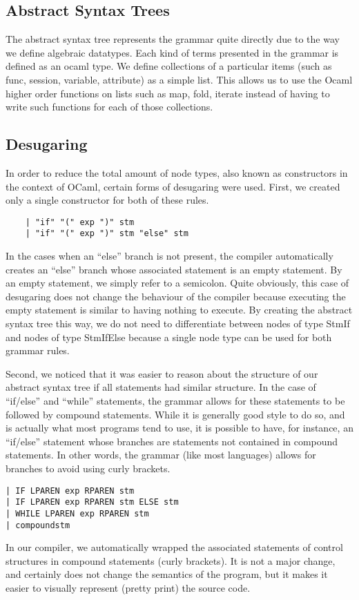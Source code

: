 \documentclass{WigReport}
\begin{document}
\subsection{Abstract Syntax Trees}
The abstract syntax tree represents the grammar quite directly due to the way we define algebraic datatypes. Each kind of terms presented in the grammar is defined as an ocaml type. We define collections of a particular items (such as func, session, variable, attribute) as a simple list. This allows us to use the Ocaml higher order functions on lists such as map, fold, iterate instead of having to write such functions for each of those collections.

\subsection{Desugaring}
In order to reduce the total amount of node types, also known as constructors in the context of OCaml, certain forms of desugaring were used. First, we created only a single constructor for both of these rules. 
\begin{verbatim}
    | "if" "(" exp ")" stm
    | "if" "(" exp ")" stm "else" stm
\end{verbatim}
In the cases when an ``else'' branch is not present, the compiler automatically creates an ``else'' branch whose associated statement is an empty statement. By an empty statement, we simply refer to a semicolon. Quite obviously, this case of desugaring does not change the behaviour of the compiler because executing the empty statement is similar to having nothing to execute. By creating the abstract syntax tree this way, we do not need to differentiate between nodes of type StmIf and nodes of type StmIfElse because a single node type can be used for both grammar rules.

Second, we noticed that it was easier to reason about the structure of our abstract syntax tree if all statements had similar structure. In the case of ``if/else'' and ``while'' statements, the grammar allows for these statements to be followed by compound statements. While it is generally good style to do so, and is actually what most programs tend to use, it is possible to have, for instance, an ``if/else'' statement whose branches are statements not contained in compound statements. In other words, the grammar (like most languages) allows for branches to avoid using curly brackets. 
\begin{verbatim}
| IF LPAREN exp RPAREN stm
| IF LPAREN exp RPAREN stm ELSE stm
| WHILE LPAREN exp RPAREN stm
| compoundstm
\end{verbatim}
In our compiler, we automatically wrapped the associated statements of control structures in compound statements (curly brackets). It is not a major change, and certainly does not change the semantics of the program, but it makes it easier to visually represent (pretty print) the source code.
\end{document}
